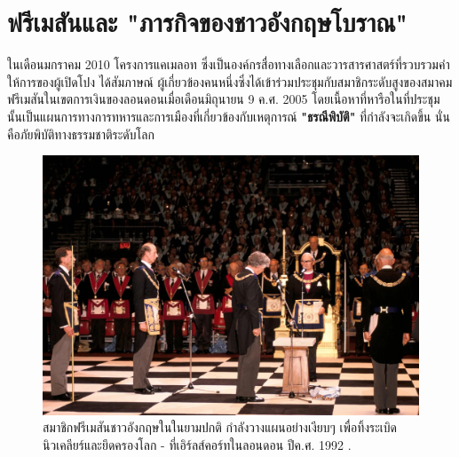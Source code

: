 \documentclass[10pt,twocolumn,letterpaper]{article}
\begin{document}
\section{ฟรีเมสันและ "ภารกิจของชาวอังกฤษโบราณ"}
ในเดือนมกราคม 2010 โครงการแคเมลอท ซึ่งเป็นองค์กรสื่อทางเลือกและวารสารศาสตร์ที่รวบรวมคำให้การของผู้เปิดโปง ได้สัมภาษณ์ \cite{4,6} ผู้เกี่ยวข้องคนหนึ่งซึ่งได้เข้าร่วมประชุมกับสมาชิกระดับสูงของสมาคมฟรีเมสันในเขตการเงินของลอนดอนเมื่อเดือนมิถุนายน 9 ค.ศ. 2005 โดยเนื้อหาที่หารือในที่ประชุมนั้นเป็นแผนการทางการทหารและการเมืองที่เกี่ยวข้องกับเหตุการณ์ \textbf{"ธรณีพิบัติ"} ที่กำลังจะเกิดขึ้น นั่นคือภัยพิบัติทางธรรมชาติระดับโลก

\begin{figure}[b]
\begin{center}
   \includegraphics[width=1\linewidth]{freemason.jpg}
\end{center}
   \caption{สมาชิกฟรีเมสันชาวอังกฤษในในยามปกติ กำลังวางแผนอย่างเงียบๆ เพื่อทิ้งระเบิดนิวเคลียร์และยึดครองโลก - ที่เอิร์ลส์คอร์ทในลอนดอน ปีค.ศ. 1992 \cite{5}.}
\label{fig:1}
\label{fig:onecol}
\end{figure}
\end{document}
